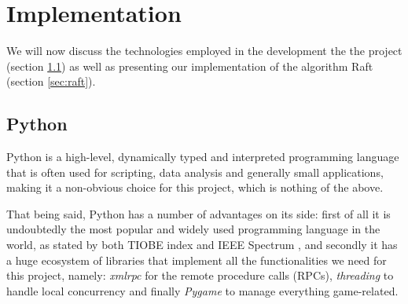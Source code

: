 \section{Implementation}

We will now discuss the technologies employed in the development the the project (section \ref{sec:python}) as well as presenting our implementation of the algorithm Raft (section \ref{sec:raft}).

\subsection{Python} \label{sec:python}

Python is a high-level, dynamically typed and interpreted programming language that is often used for scripting, data analysis and generally small applications, making it a non-obvious choice for this project, which is nothing of the above. 

That being said, Python has a number of advantages on its side: first of all it is undoubtedly the most popular and widely used programming language in the world, as stated by both TIOBE index and IEEE Spectrum \cite{tiobe} \cite{ieeeSpect}, and secondly it has a huge ecosystem of libraries that implement all the functionalities we need for this project, namely: \textit{xmlrpc} for the remote procedure calls (RPCs), \textit{threading} to handle local concurrency and finally \textit{Pygame} to manage everything game-related.  